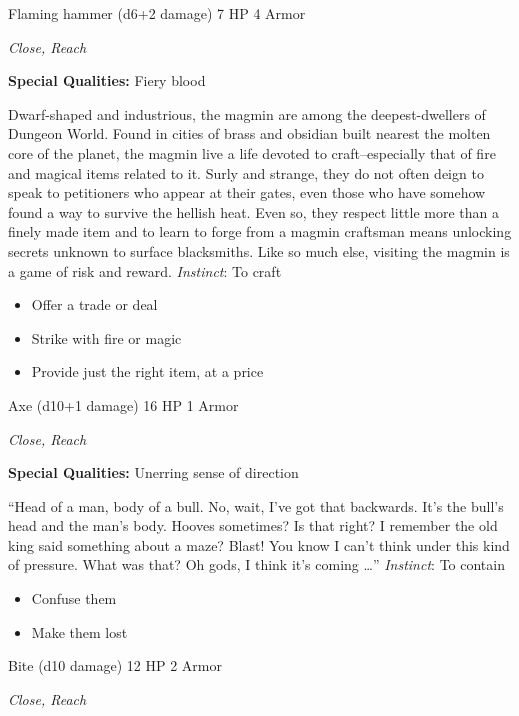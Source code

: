 Flaming hammer (d6+2 damage)\hspace*{\fill} 7 HP 4 Armor

\emph{Close, Reach}

\textbf{Special Qualities:}
Fiery blood

\HRule
Dwarf-shaped and industrious, the magmin are among the deepest-dwellers of Dungeon World. Found in cities of brass and obsidian built nearest the molten core of the planet, the magmin live a life devoted to craft--especially that of fire and magical items related to it. Surly and strange, they do not often deign to speak to petitioners who appear at their gates, even those who have somehow found a way to survive the hellish heat. Even so, they respect little more than a finely made item and to learn to forge from a magmin craftsman means unlocking secrets unknown to surface blacksmiths. Like so much else, visiting the magmin is a game of risk and reward. \emph{Instinct}: To craft
\begin{itemize}
\item Offer a trade or deal
\item Strike with fire or magic
\item Provide just the right item, at a price
\end{itemize}

\HRule
{}

Axe (d10+1 damage)\hspace*{\fill} 16 HP 1 Armor

\emph{Close, Reach}

\textbf{Special Qualities:}
Unerring sense of direction

\HRule
``Head of a man, body of a bull. No, wait, I've got that backwards. It's the bull's head and the man's body. Hooves sometimes? Is that right? I remember the old king said something about a maze? Blast! You know I can't think under this kind of pressure. What was that? Oh gods, I think it's coming \ldots '' \emph{Instinct}: To contain
\begin{itemize}
\item Confuse them
\item Make them lost
\end{itemize}
\newpage
\HRule
{}

Bite (d10 damage)\hspace*{\fill} 12 HP 2 Armor

\emph{Close, Reach}

